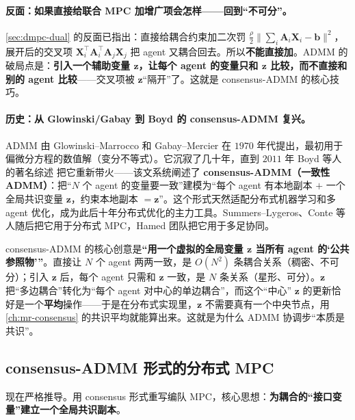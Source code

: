 \paragraph{反面：如果直接给联合 MPC 加增广项会怎样——回到“不可分”。}
\cref{sec:dmpc-dual} 的反面已指出：直接给耦合约束加二次罚 $\tfrac{\rho}{2}\|\sum_i \mathbf{A}_i\mathbf{X}_i-\mathbf{b}\|^2$，展开后的交叉项 $\mathbf{X}_i^\top \mathbf{A}_i^\top \mathbf{A}_j\mathbf{X}_j$ 把 agent 又耦合回去。所以\textbf{不能直接加}。ADMM 的破局点是：\textbf{引入一个辅助变量 $\mathbf{z}$，让每个 agent 的变量只和 $\mathbf{z}$ 比较，而不直接和别的 agent 比较}——交叉项被 $\mathbf{z}$“隔开”了。这就是 consensus-ADMM 的核心技巧。

\paragraph{历史：从 Glowinski/Gabay 到 Boyd 的 consensus-ADMM 复兴。}
ADMM 由 Glowinski--Marrocco 和 Gabay--Mercier 在 $1970$ 年代提出，最初用于偏微分方程的数值解（变分不等式）。它沉寂了几十年，直到 $2011$ 年 Boyd 等人的著名综述\cite{boyd2011admm} 把它重新带火——该文系统阐述了 \textbf{consensus-ADMM（一致性 ADMM）}：把“$N$ 个 agent 的变量要一致”建模为“每个 agent 有本地副本 $+$ 一个全局共识变量 $\mathbf{z}$，约束本地副本 $=\mathbf{z}$”。这个形式天然适配分布式机器学习和多 agent 优化，成为此后十年分布式优化的主力工具。Summers--Lygeros、Conte 等人随后把它用于分布式 MPC\cite{conte2016distributed}，Hamed 团队把它用于多足协同\cite{kim2023layered}。

\begin{insight}\label{ins:dmpc-z-star}
consensus-ADMM 的核心创意是\textbf{“用一个虚拟的全局变量 $\mathbf{z}$ 当所有 agent 的‘公共参照物’”}。直接让 $N$ 个 agent 两两一致，是 $O(N^2)$ 条耦合关系（稠密、不可分）；引入 $\mathbf{z}$ 后，每个 agent 只需和 $\mathbf{z}$ 一致，是 $N$ 条关系（星形、可分）。$\mathbf{z}$ 把“多边耦合”转化为“每个 agent 对中心的单边耦合”，而这个“中心” $\mathbf{z}$ 的更新恰好是一个\textbf{平均}操作——于是在分布式实现里，$\mathbf{z}$ 不需要真有一个中央节点，用 \cref{ch:mr-consensus} 的共识平均就能算出来。这就是为什么 ADMM 协调步“本质是共识”。
\end{insight}

\subsection{consensus-ADMM 形式的分布式 MPC}
\label{sec:dmpc-admm-derive}

现在严格推导。用 consensus 形式重写编队 MPC，核心思想：\textbf{为耦合的“接口变量”建立一个全局共识副本}。

